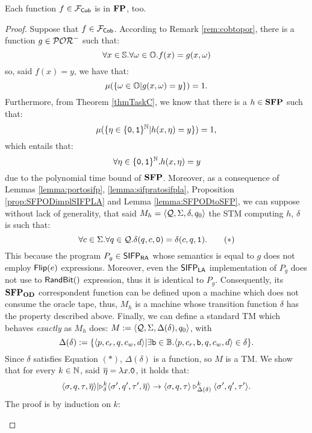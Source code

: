 \begin{lemma}
  \label{lemma:polyFsoundness}
  Each function $f \in \mathcal{F}_{\mathsf{Cob}}$ is in $\mathbf{FP}$, too.
\end{lemma}
\begin{proof}
  Suppose that $f \in \mathcal{F}_{\mathsf{Cob}}$. According to Remark \ref{rem:cobtopor}, there is a function $g \in \mathcal{POR}^-$ such that:
  $$
  \forall x\in \mathbb{S}.\forall \omega \in \mathbb{O}. f(x)=g(x, \omega)
  $$
  so, said $f(x)=y$, we have that:
  $$
  \mu(\{\omega \in \mathbb{O}| g(x, \omega)= y\})=1.
  $$
  Furthermore, from Theorem \ref{thmTaskC},
  we know that there is a $h \in \mathbf{SFP}$ such that:
  $$
  \mu(\{\eta \in \{\mathtt{0}, \mathtt{1}\}^{\mathbb{N}}| h(x, \eta)= y\})=1,
  $$
  which entails that:
  $$
  \forall \eta \in \{\mathtt{0}, \mathtt{1}\}^{\mathbb{N}}. h(x, \eta)= y
  $$
  due to the polynomial time bound of $\mathbf{SFP}$.
  Moreover, as a consequence of Lemmas
    \ref{lemma:portosifp}, \ref{lemma:sifpratosifpla}, Proposition \ref{prop:SFPODimplSIFPLA}
    and Lemma \ref{lemma:SFPODtoSFP}, we can suppose
  without lack of generality, that
  said $M_h=\langle \mathcal{Q}, \Sigma, \delta, q_0\rangle$ the STM computing $h$,
  $\delta$ is such that:
  \begin{equation}
    \forall c \in\Sigma.\forall  q \in \mathcal{Q}. \delta(q, c, \mathtt{0})=\delta(c, q, \mathtt{1}).\tag{$*$}
  \end{equation}
  This because the program $P_g \in \mathsf{SIFP_{{\mathsf{RA}}}}$ whose semantics is equal to $g$
  does not employ $\mathsf{Flip(}e\mathsf{)}$ expressions. Moreover, even the $\mathsf{SIFP_{{\mathsf{LA}}}}$ implementation
  of $P_g$ does not use to $\mathsf{RandBit()}$ expression, thus it is identical to $P_g$.
  Consequently, its $\mathbf{SFP_{\mathbf{OD}}}$ correspondent function can be defined upon a machine
  which does not consume the oracle tape, thus, $M_h$ is a
  machine whose transition function $\delta$ has the property described above.
  Finally, we can define a standard TM which behaves \emph{exactly} as $M_h$ does:
  $M:= \langle \mathcal{Q}, \Sigma, \Delta(\delta), q_0\rangle$, with
  $$
    \Delta(\delta) :=\{ \langle p, c_r, q, c_w, d\rangle | \exists \mathtt{b} \in \mathbb{B}. \langle p, c_r, \mathtt{b}, q, c_w, d\rangle \in \delta \}.
  $$
\noindent
  Since $\delta$ satisfies Equation $(*)$, $\Delta(\delta)$ is a function, so
  $M$ is a TM.
 We show that for every $k \in \mathbb{N}$, said $\overline \eta= \lambda x.\mathtt{0}$,
 it holds that:
  $$
  \langle \sigma, q, \tau, \overline \eta\rangle \lvert\triangleright_\delta^k \langle \sigma', q', \tau', \overline \eta\rangle
  \to
  \langle \sigma, q, \tau\rangle \triangleright_{\Delta(\delta)}^k \langle \sigma', q', \tau'\rangle.
  $$
  The proof is by induction on $k$:
  \begin{itemize}

\end{itemize}
\end{proof}
